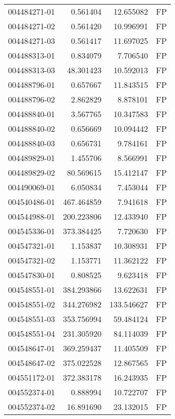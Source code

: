 \begin{tabular}{lrrl}
004484271-01 &    0.561404 &      12.655082 &   FP \\
004484271-02 &    0.561420 &      10.996991 &   FP \\
004484271-03 &    0.561417 &      11.697025 &   FP \\
004488313-01 &    0.834079 &       7.706540 &   FP \\
004488313-03 &   48.301423 &      10.592013 &   FP \\
004488796-01 &    0.657667 &      11.843515 &   FP \\
004488796-02 &    2.862829 &       8.878101 &   FP \\
004488840-01 &    3.567765 &      10.347583 &   FP \\
004488840-02 &    0.656669 &      10.094442 &   FP \\
004488840-03 &    0.656731 &       9.784161 &   FP \\
004489829-01 &    1.455706 &       8.566991 &   FP \\
004489829-02 &   80.569615 &      15.412147 &   FP \\
004490069-01 &    6.050834 &       7.453044 &   FP \\
004540486-01 &  467.464859 &       7.941618 &   FP \\
004544988-01 &  200.223806 &      12.433940 &   FP \\
004545336-01 &  373.384425 &       7.720630 &   FP \\
004547321-01 &    1.153837 &      10.308931 &   FP \\
004547321-02 &    1.153771 &      11.362122 &   FP \\
004547830-01 &    0.808525 &       9.623418 &   FP \\
004548551-01 &  384.293866 &      13.622631 &   FP \\
004548551-02 &  344.276982 &     133.546627 &   FP \\
004548551-03 &  353.756994 &      59.484124 &   FP \\
004548551-04 &  231.305920 &      84.114039 &   FP \\
004548647-01 &  369.259437 &      11.405509 &   FP \\
004548647-02 &  375.022528 &      12.867565 &   FP \\
004551172-01 &  372.383178 &      16.243935 &   FP \\
004552374-01 &    0.888994 &      10.722707 &   FP \\
004552374-02 &   16.891690 &      23.132015 &   FP \\

\end{tabular}
